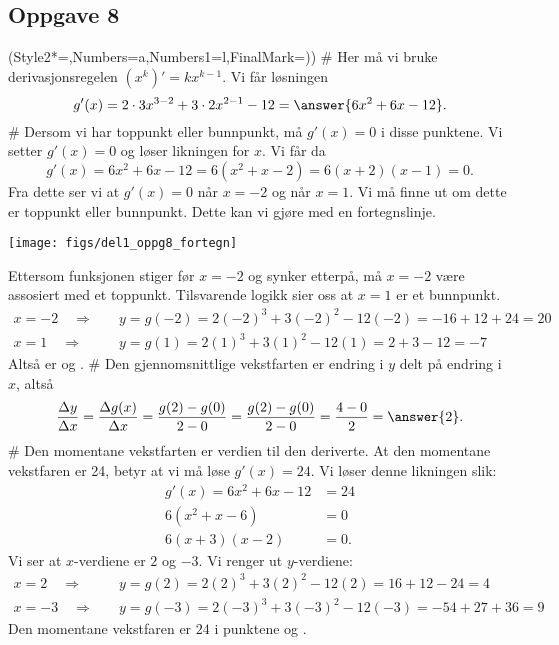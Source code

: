 \subsection*{Oppgave 8}
\begin{easylist}[enumerate]
	\ListProperties(Style2*=,Numbers=a,Numbers1=l,FinalMark={)})
	# Her må vi bruke derivasjonsregelen $\left(x^k\right)' = k x^{k-1}$. Vi får løsningen
	\begin{equation*}
		g'(x) = 2 \cdot 3 x^{3-2} + 3 \cdot 2 x^{2-1} - 12 = \answer{6x^2 + 6x - 12}.
	\end{equation*}
	# Dersom vi har toppunkt eller bunnpunkt, må $g'(x)= 0$ i disse punktene. Vi setter $g'(x) = 0$ og løser likningen for $x$. Vi får da
	\begin{equation*}
		g'(x) = 6x^2 + 6x - 12 = 6(x^2 + x - 2) = 6(x+2)(x-1)= 0.
	\end{equation*}
	Fra dette ser vi at $g'(x) = 0$ når $x = -2$ og når $x = 1$. Vi må finne ut om dette er toppunkt eller bunnpunkt. Dette kan vi gjøre med en fortegnslinje.
	\begin{center}
		\texttt{[image: figs/del1\_oppg8\_fortegn]}
	\end{center}
	Ettersom funksjonen stiger før $x=-2$ og synker etterpå, må $x=-2$ være assosiert med et toppunkt. Tilsvarende logikk sier oss at $x=1$ er et bunnpunkt.
	\begin{align*}
		x = -2 \quad \Rightarrow& \quad y = g(-2) = 2(-2)^3 + 3 (-2)^2 - 12(-2) = -16 + 12 + 24 = 20 \\
		x = 1 \quad \Rightarrow& \quad y = g(1) = 2(1)^3 + 3 (1)^2 - 12(1) = 2 + 3 - 12 = -7
	\end{align*}
	Altså er  og .
	# Den gjennomsnittlige vekstfarten er endring i $y$ delt på endring i $x$, altså
	\begin{equation*}
		\frac{\Delta y}{\Delta x} = \frac{\Delta g(x)}{\Delta x} = \frac{g(2) - g(0)}{2 - 0} = \frac{g(2) - g(0)}{2 - 0} = \frac{4 - 0}{2} = \answer{2}.
	\end{equation*}
	# Den momentane vekstfarten er verdien til den deriverte.
	At den momentane vekstfaren er 24, betyr at vi må løse $g'(x) = 24$. 
	Vi løser denne likningen slik:
	\begin{align*}
		g'(x) = 6x^2 + 6x - 12 &= 24 \\
		6(x^2 + x - 6) &= 0 \\
		6(x + 3)(x - 2) &= 0.
	\end{align*}
	Vi ser at $x$-verdiene er $2$ og $-3$. Vi renger ut $y$-verdiene:
	\begin{align*}
	x = 2 \quad \Rightarrow& \quad y = g(2) = 2(2)^3 + 3 (2)^2 - 12(2) = 16 + 12 - 24 = 4\\
	x = -3 \quad \Rightarrow& \quad y = g(-3) = 2(-3)^3 + 3 (-3)^2 - 12(-3) = -54 + 27 + 36 = 9
	\end{align*}
	Den momentane vekstfaren er $24$ i punktene  og .
\end{easylist}


